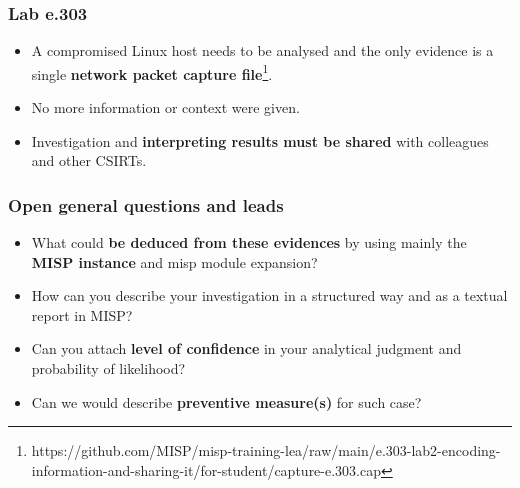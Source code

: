 
\begin{frame}[t,plain]
\titlepage
\end{frame}

\begin{frame}
    \frametitle{Lab e.303}
    \begin{itemize}
        \item A compromised Linux host needs to be analysed and the only evidence is a single {\bf network packet capture file}\footnote{https://github.com/MISP/misp-training-lea/raw/main/e.303-lab2-encoding-information-and-sharing-it/for-student/capture-e.303.cap}.
        \item No more information or context were given.
        \item Investigation and {\bf interpreting results must be shared} with colleagues and other CSIRTs.
    \end{itemize}

\end{frame}

\begin{frame}
   \frametitle{Open general questions and leads}
    \begin{itemize}
        \item What could {\bf be deduced from these evidences} by using mainly the {\bf MISP instance} and misp module expansion?
        \item How can you describe your investigation in a structured way and as a textual report in MISP?
        \item Can you attach {\bf level of confidence} in your analytical judgment and probability of likelihood?
        \item Can we would describe {\bf preventive measure(s)} for such case?
    \end{itemize}
\end{frame}

